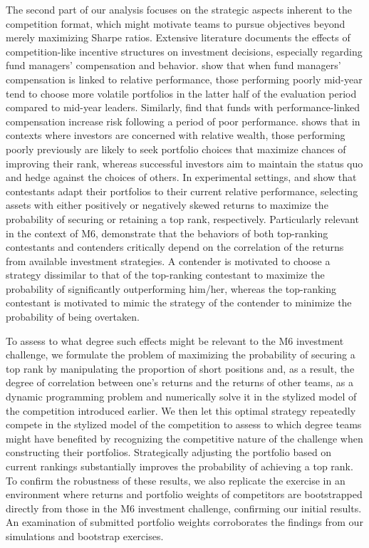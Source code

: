 \documentclass[3p,times,twocolumn]{elsarticle}
\begin{document}
The second part of our analysis focuses on the strategic aspects inherent to the competition format, which might motivate teams to pursue objectives beyond merely maximizing Sharpe ratios. 
Extensive literature documents the effects of competition-like incentive structures on investment decisions, especially regarding fund managers' compensation and behavior. 
\citet{brownTournamentsTemptationsAnalysis1996} show that when fund managers' compensation is linked to relative performance, those performing poorly mid-year tend to choose more volatile portfolios in the latter half of the evaluation period compared to mid-year leaders.
Similarly, \citet{eltonIncentiveFeesMutual2003} find that funds with performance-linked compensation increase risk following a period of poor performance.
\citet{krasnyAssetPricingStatus2011} shows that in contexts where investors are concerned with relative wealth, those performing poorly previously are likely to seek portfolio choices that maximize chances of improving their rank, whereas successful investors aim to maintain the status quo and hedge against the choices of others.
In experimental settings, \citet{linFundConvexityTail2011} and \citet{dijkRankMattersImpact2014} show that contestants adapt their portfolios to their current relative performance, selecting assets with either positively or negatively skewed returns to maximize the probability of securing or retaining a top rank, respectively.
Particularly relevant in the context of M6, \citet{niekenRisktakingTournamentsTheory2010} demonstrate that the behaviors of both top-ranking contestants and contenders critically depend on the correlation of the returns from available investment strategies.
A contender is motivated to choose a strategy dissimilar to that of the top-ranking contestant to maximize the probability of significantly outperforming him/her, whereas the top-ranking contestant is motivated to mimic the strategy of the contender to minimize the probability of being overtaken.

To assess to what degree such effects might be relevant to the M6 investment challenge, we formulate the problem of maximizing the probability of securing a top rank by manipulating the proportion of short positions and, as a result, the degree of correlation between one's returns and the returns of other teams, as a dynamic programming problem and numerically solve it in the stylized model of the competition introduced earlier.
We then let this optimal strategy repeatedly compete in the stylized model of the competition to assess to which degree teams might have benefited by recognizing the competitive nature of the challenge when constructing their portfolios.
Strategically adjusting the portfolio based on current rankings substantially improves the probability of achieving a top rank.
To confirm the robustness of these results, we also replicate the exercise in an environment where returns and portfolio weights of competitors are bootstrapped directly from those in the M6 investment challenge, confirming our initial results.
An examination of submitted portfolio weights corroborates the findings from our simulations and bootstrap exercises.
\end{document}
